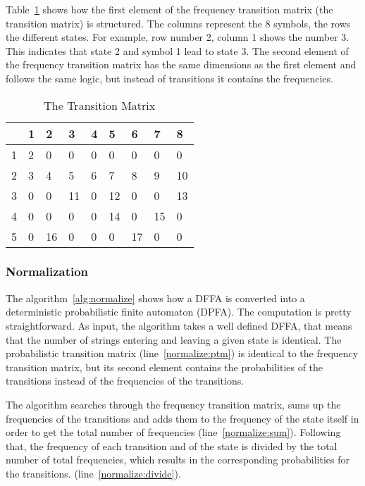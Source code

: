 \documentclass[
a4paper,
12pt
]{scrartcl}
\newcommand{\gray}{\cellcolor{grayself}}  %
\begin{document}
Table~\ref{table:transitionMatrix} shows how the first element of the frequency transition matrix (the transition matrix) is structured. The columns represent the 8 symbols, the rows the different states. For example,  row number 2, column 1 shows the number 3. This indicates that state 2 and symbol 1 lead to state 3. The second element of the frequency transition matrix has the same dimensions as the first element and follows the same logic, but instead of transitions it contains the frequencies.

\begin{table}[ht!]
\centering
\begin{tabular}{|l|l|l|l|l|l|l|l|l|}
\hline
\gray &\gray 1 & \gray 2  & \gray 3  & \gray 4 & \gray 5  & \gray 6  & \gray 7  & \gray 8  \\ \hline
\gray 1&2 & 0  & 0  & 0 & 0  & 0  & 0  & 0  \\ \hline
\gray 2&3 & 4  & 5  & 6 & 7  & 8  & 9  & 10 \\ \hline
\gray 3&0 & 0  & 11 & 0 & 12 & 0  & 0  & 13 \\ \hline
\gray 4&0 & 0  & 0  & 0 & 14 & 0  & 15 & 0  \\ \hline
\gray 5&0 & 16 & 0  & 0 & 0  & 17 & 0  & 0  \\ \hline
\end{tabular}
\caption{The Transition Matrix}
\label{table:transitionMatrix}
\end{table}

\subsubsection{Normalization}

The algorithm~\ref{alg:normalize} shows how a DFFA is converted into a deterministic probabilistic finite automaton (DPFA). The computation is pretty straightforward. As input, the algorithm takes a well defined DFFA, that means that the number of strings entering and leaving a given state is identical. The probabilistic transition matrix (line~\ref{normalize:ptm}) is identical to the frequency transition matrix, but its second element contains the probabilities of the transitions instead of the frequencies of the transitions.

The algorithm searches through the frequency transition matrix, sums up the frequencies of the transitions and adds them to the frequency of the state itself in order to get the total number of frequencies (line~\ref{normalize:sum}). Following that, the frequency of each transition and of the state is divided by the total number of total frequencies, which results in the corresponding probabilities for the transitions. (line~\ref{normalize:divide}).
\end{document}
